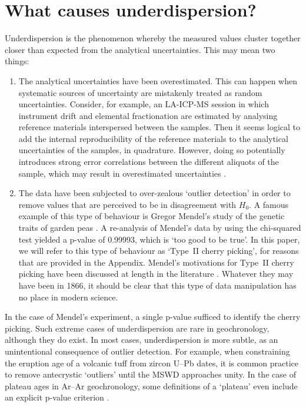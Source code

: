 \documentclass[gchron, manuscript]{copernicus}
\begin{document}
\section{What causes underdispersion?}\label{sec:causes}

Underdispersion is the phenomenon whereby the measured values cluster
together closer than expected from the analytical uncertainties.  This
may mean two things:

\begin{enumerate}
  \item The analytical uncertainties have been overestimated. This can
    happen when systematic sources of uncertainty are mistakenly
    treated as random uncertainties. Consider, for example, an
    LA-ICP-MS session in which instrument drift and elemental
    fractionation are estimated by analysing reference materials
    interspersed between the samples. Then it seems logical to add the
    internal reproducibility of the reference materials to the
    analytical uncertainties of the samples, in quadrature. However,
    doing so potentially introduces strong error correlations between
    the different aliquots of the sample, which may result in
    overestimated uncertainties \citep{mclean2016}.
  \item The data have been subjected to over-zealous `outlier
    detection' in order to remove values that are perceived to be in
    disagreement with $H_0$. A famous example of this type of
    behaviour is Gregor Mendel's study of the genetic traits of garden
    peas \citep{mendel1866}. A re-analysis of Mendel's data by
    \citet{fisher1936} using the chi-squared test yielded a p-value of
    0.99993, which is `too good to be true'. In this paper, we will
    refer to this type of behaviour as `Type~II cherry picking', for
    reasons that are provided in the Appendix. Mendel's motivations
    for Type~II cherry picking have been discussed at length in the
    literature \citep{radick2015}. Whatever they may have been in
    1866, it should be clear that this type of data manipulation has no
    place in modern science.
\end{enumerate}

In the case of Mendel's experiment, a single p-value sufficed to
identify the cherry picking. Such extreme cases of underdispersion are
rare in geochronology, although they do exist. In most cases,
underdispersion is more subtle, as an unintentional consequence of
outlier detection. For example, when constraining the eruption age of
a volcanic tuff from zircon U--Pb dates, it is common practice to
remove antecrystic `outliers' until the MSWD approaches unity. In the
case of plateau ages in Ar--Ar geochronology, some definitions of a
`plateau' even include an explicit p-value criterion
\citep{jourdan2009}.\medskip
\end{document}
